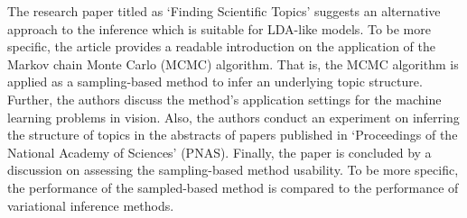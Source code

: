 \documentclass{mprop}
\begin{document}
\par The research paper titled as `Finding Scientific Topics' \cite{griffiths} suggests an alternative approach to the inference which is suitable for LDA-like models. To be more specific, the article provides a readable introduction on the application of the Markov chain Monte Carlo (MCMC) algorithm. That is, the MCMC algorithm is applied as a sampling-based method to infer an underlying topic structure. Further, the authors discuss the method's application settings for the machine learning problems in vision. Also, the authors conduct an experiment on inferring the structure of topics in the abstracts of papers published in `Proceedings of the National Academy of Sciences' (PNAS). Finally, the paper is concluded by a discussion on assessing the sampling-based method usability. To be more specific, the performance of the sampled-based method is compared to the performance of variational inference methods. 
\end{document}
